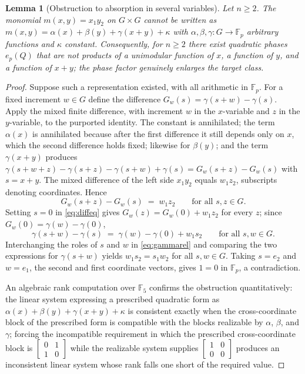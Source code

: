 \documentclass[11pt]{article}
\newtheorem{lemma}{Lemma}
\theoremstyle{remark}
\begin{document}
\begin{lemma}[Obstruction to absorption in several variables]\label{lem:noabsorb}
Let $n\ge2$. The monomial $m(x,y)=x_1y_2$ on $G\times G$ cannot be written
as
$m(x,y)=\alpha(x)+\beta(y)+\gamma(x+y)+\kappa$
with $\alpha,\beta,\gamma:G\to\mathbb{F}_p$ arbitrary functions and
$\kappa$ constant. Consequently, for $n\ge2$ there exist quadratic phases
$e_p(Q)$ that are not products of a unimodular function of $x$, a function
of $y$, and a function of $x+y$; the phase factor genuinely enlarges the
target class.
\end{lemma}

\begin{proof}
Suppose such a representation existed, with all arithmetic in
$\mathbb{F}_p$. For a fixed increment $w\in G$ define the difference
$G_w(s)=\gamma(s+w)-\gamma(s)$. Apply the mixed finite difference, with
increment $w$ in the $x$-variable and $z$ in the $y$-variable, to the
purported identity. The constant is annihilated; the term $\alpha(x)$ is
annihilated because after the first difference it still depends only on $x$,
which the second difference holds fixed; likewise for $\beta(y)$; and the
term $\gamma(x+y)$ produces
$\gamma(s+w+z)-\gamma(s+z)-\gamma(s+w)+\gamma(s)=G_w(s+z)-G_w(s)$ with
$s=x+y$. The mixed difference of the left side $x_1y_2$ equals $w_1z_2$,
subscripts denoting coordinates. Hence
\begin{equation}\label{eq:diffeq}
G_w(s+z)-G_w(s)\;=\;w_1z_2
\qquad\text{for all } s,z\in G.
\end{equation}
Setting $s=0$ in \eqref{eq:diffeq} gives $G_w(z)=G_w(0)+w_1z_2$ for every
$z$; since $G_w(0)=\gamma(w)-\gamma(0)$,
\begin{equation}\label{eq:gammarel}
\gamma(s+w)-\gamma(s)\;=\;\gamma(w)-\gamma(0)+w_1s_2
\qquad\text{for all } s,w\in G.
\end{equation}
Interchanging the roles of $s$ and $w$ in \eqref{eq:gammarel} and comparing
the two expressions for $\gamma(s+w)$ yields
$w_1s_2=s_1w_2$ for all $s,w\in G$. Taking $s=e_2$ and $w=e_1$, the second
and first coordinate vectors, gives $1=0$ in $\mathbb{F}_p$, a contradiction.

An algebraic rank computation over $\mathbb{F}_5$ confirms the obstruction
quantitatively: the linear system expressing a prescribed quadratic form as
$\alpha(x)+\beta(y)+\gamma(x+y)+\kappa$ is consistent exactly when the
cross-coordinate block of the prescribed form is compatible with the blocks
realizable by $\alpha$, $\beta$, and $\gamma$; forcing the incompatible
requirement in which the prescribed cross-coordinate block is
$\left[\begin{smallmatrix}0&1\\1&0\end{smallmatrix}\right]$ while the
realizable system supplies
$\left[\begin{smallmatrix}1&0\\0&0\end{smallmatrix}\right]$
produces an inconsistent linear system whose rank falls one short of the
required value.
\end{proof}
\end{document}
